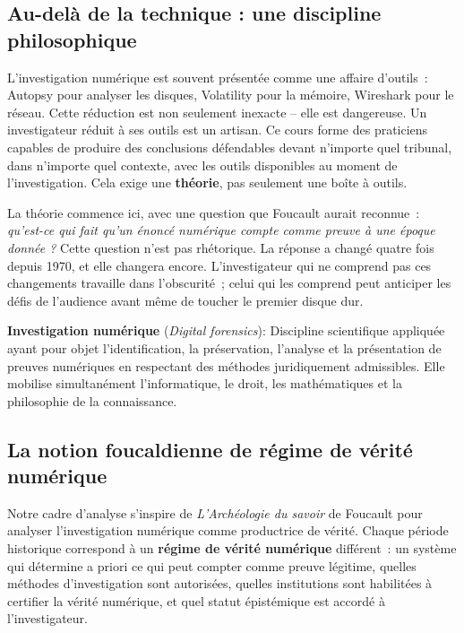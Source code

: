 \subsection{Au-delà de la technique : une discipline philosophique}

L'investigation numérique est souvent présentée comme une affaire d'outils~:
Autopsy pour analyser les disques, Volatility pour la mémoire, Wireshark pour
le réseau. Cette réduction est non seulement inexacte -- elle est dangereuse.
Un investigateur réduit à ses outils est un artisan. Ce cours forme des
praticiens capables de produire des conclusions défendables devant n'importe
quel tribunal, dans n'importe quel contexte, avec les outils disponibles au
moment de l'investigation. Cela exige une \textbf{théorie}, pas seulement
une boîte à outils.

\medskip

La théorie commence ici, avec une question que Foucault aurait reconnue~:
\textit{qu'est-ce qui fait qu'un énoncé numérique compte comme preuve à
une époque donnée ?} Cette question n'est pas rhétorique. La réponse a changé
quatre fois depuis 1970, et elle changera encore. L'investigateur qui ne
comprend pas ces changements travaille dans l'obscurité~; celui qui les
comprend peut anticiper les défis de l'audience avant même de toucher
le premier disque dur.

\begin{boxdef}
\textbf{Investigation numérique} (\textit{Digital forensics}):
Discipline scientifique appliquée ayant pour objet l'identification,
la préservation, l'analyse et la présentation de preuves numériques en
respectant des méthodes juridiquement admissibles. Elle mobilise
simultanément l'informatique, le droit, les mathématiques et la philosophie
de la connaissance.
\end{boxdef}

\subsection{La notion foucaldienne de régime de vérité numérique}

Notre cadre d'analyse s'inspire de \textit{L'Archéologie du savoir} de
Foucault \cite{foucault1969} pour analyser l'investigation numérique comme
 productrice de vérité. Chaque période
historique correspond à un \textbf{régime de vérité numérique} différent~:
un système qui détermine a priori ce qui peut compter comme preuve légitime,
quelles méthodes d'investigation sont autorisées, quelles institutions sont
habilitées à certifier la vérité numérique, et quel statut épistémique est
accordé à l'investigateur.

